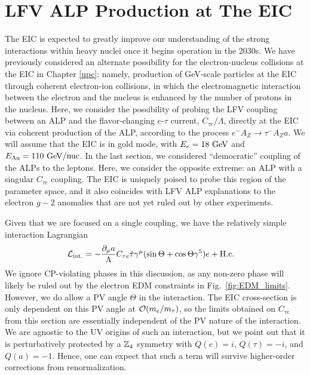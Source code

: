 \section{LFV ALP Production at The EIC}\label{sec:EIC_ALP}

The EIC is expected to greatly improve our understanding of the strong interactions within heavy nuclei once it begins operation in the 2030s. We have previously considered an alternate possibility for the electron-nucleus collisions at the EIC in Chapter \ref{upc}: namely, production of GeV-scale particles at the EIC through coherent electron-ion collisions, in which the electromagnetic interaction between the electron and the nucleus is enhanced by the number of protons in the nucleus. Here, we consider the possibility of probing the LFV coupling between an ALP and the flavor-changing $e$-$\tau$ current, $C_{\tau e}/\Lambda$, directly at the EIC via coherent production of the ALP, according to the process $e^- A_Z \rightarrow \tau^- A_Z a$. We will assume that the EIC is in gold mode, with $E_e = 18~{\rm GeV}$ and $E_{\rm Au} = 110~{\rm GeV}/{\rm nuc}$. In the last section, we considered ``democratic'' coupling of the ALPs to the leptons. Here, we consider the opposite extreme: an ALP with a singular $C_{\tau e}$ coupling. The EIC is uniquely poised to probe this region of the parameter space, and it also coincides with LFV ALP explanations to the electron $g-2$ anomalies that are not yet ruled out by other experiments.

Given that we are focused on a single coupling, we have the relatively simple interaction Lagrangian
\begin{align}
    {\cal L}_{\rm int.} &= -\frac{\partial_\mu a}{\Lambda} C_{\tau e}\bar{\tau}\gamma^\mu( \sin{\Theta} + \cos{\Theta}\gamma^5)e + {\rm H.c.}
\end{align}
We ignore CP-violating phases in this discussion, as any non-zero phase will likely be ruled out by the electron EDM constraints in Fig.~\ref{fig:EDM_limits}. However, we do allow a PV angle $\Theta$ in the interaction. The EIC cross-section is only dependent on this PV angle at ${\cal O}(m_e/m_\tau)$, so the limits obtained on $C_{\tau e}$ from this section are essentially independent of the PV nature of the interaction. We are agnostic to the UV origins of such an interaction, but we point out that it is perturbatively protected by a ${\Bbb Z}_4$ symmetry with $Q(e) = i$, $Q(\tau)  = -i$, and $Q(a) = -1$. Hence, one can expect that such a term will survive higher-order corrections from renormalization.


